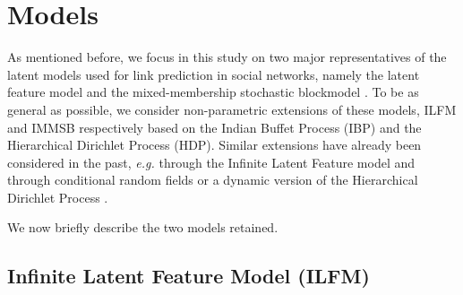 \section{Models}
\label{sec:models}

As mentioned before, we focus in this study on two major representatives of the latent models used for link prediction in social networks, namely the latent feature model \cite{BMF} and the mixed-membership stochastic blockmodel \cite{MMSB}. To be as general as possible, we consider non-parametric extensions of these models, ILFM and IMMSB respectively based on the Indian Buffet Process (IBP) and the Hierarchical Dirichlet Process (HDP). Similar extensions have already been considered in the past, {\it e.g.} through the Infinite Latent Feature model \cite{ILFRM} and through conditional random fields \cite{iMMSB} or a dynamic version of the Hierarchical Dirichlet Process \cite{diMMSB}.

We now briefly describe the two models retained.


\subsection{Infinite Latent Feature Model (ILFM)}

